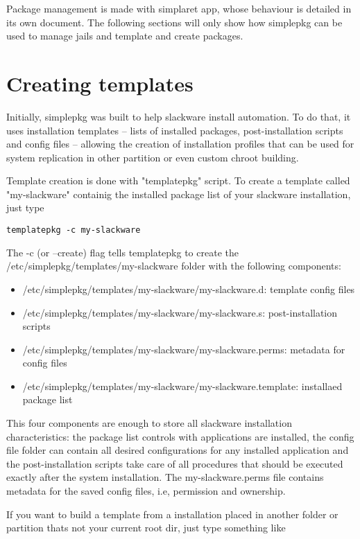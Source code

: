 \documentclass{article}
\begin{document}
Package management is made with simplaret app, whose behaviour is detailed in its own document.  The following sections will only show how simplepkg can be used to manage jails and template and create packages.

\section{Creating templates}

Initially, simplepkg was built to help slackware install automation. To do that, it uses installation templates -- lists of installed packages, post-installation scripts and config files -- allowing the creation of installation profiles that can be used for system replication in other partition or even custom chroot building.

Template creation is done with "templatepkg" script. To create a template called "my-slackware" containig the installed package list of your slackware installation, just type

\begin{verbatim}
templatepkg -c my-slackware
\end{verbatim}

The -c (or --create) flag tells templatepkg to create the /etc/simplepkg/templates/my-slackware folder with the following components:

\begin{itemize}
  \item /etc/simplepkg/templates/my-slackware/my-slackware.d: template config files
  \item /etc/simplepkg/templates/my-slackware/my-slackware.s: post-installation scripts
  \item /etc/simplepkg/templates/my-slackware/my-slackware.perms: metadata for config files
  \item /etc/simplepkg/templates/my-slackware/my-slackware.template: installaed package list
\end{itemize}

This four components are enough to store all slackware installation characteristics: the package list controls with applications are installed, the config file folder can contain all desired configurations for any installed application and the post-installation scripts take care of all procedures that should be executed exactly after the system installation. The my-slackware.perms file contains metadata for the saved config files, i.e, permission and ownership.

If you want to build a template from a installation placed in another folder or partition thats not your current root dir, just type something like
\end{document}
